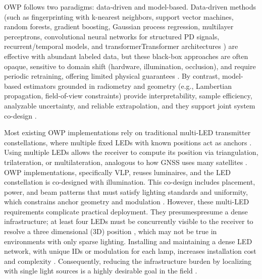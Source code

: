 \documentclass[journal]{IEEEtran}
\newcommand{\added}[1]{{\color{blue}#1}}
\newcommand{\deleted}[1]{{\color{red}#1}}
\begin{document}
OWP follows two paradigms: data-driven and model-based.
Data-driven methods (such as fingerprinting with k-nearest neighbors, support vector machines, random forests, gradient boosting, Gaussian process regression, multilayer perceptrons, convolutional neural networks for structured PD signals, recurrent/temporal models, and \deleted{transformer}\added{Transformer} architectures \cite{Rekkas2023, Tran2022}) are effective with abundant labeled data, but these black-box approaches are often opaque, sensitive to domain shift (hardware, illumination, occlusion), and require periodic retraining, offering limited physical guarantees \cite{Glass2021}. 
By contrast, model-based estimators grounded in radiometry and geometry (e.g., Lambertian propagation, field-of-view constraints) provide interpretability, sample efficiency, analyzable uncertainty, and reliable extrapolation, and they support joint system co-design \cite{Deng2023}.



Most existing OWP implementations rely on traditional multi-LED transmitter constellations, where multiple fixed LEDs with known positions act as anchors \cite{Zhuang2018}. Using multiple LEDs allows the receiver to compute its position via triangulation, trilateration, or multilateration, analogous to how GNSS uses many satellites \cite{Wang2024b}. 
OWP implementations, specifically VLP, reuses luminaires, and the LED constellation is co-designed with illumination. This co-design includes placement, power, and beam patterns that must satisfy lighting standards and uniformity, which constrains anchor geometry and modulation \cite{photonics9100750}.
However, these multi-LED requirements complicate practical deployment. They \deleted{presumes}\added{presume} a dense infrastructure; at least four LEDs must be concurrently visible to the receiver to resolve a three dimensional (3D) position \cite{Plets2019,electronics8111311, ALMADANI2021126654,Zhang2020}, which may not be true in environments with only sparse lighting. Installing and maintaining a dense LED network, with unique IDs or modulation for each lamp, increases installation cost and complexity \cite{Cossu2022}. 
Consequently, reducing the infrastructure burden by localizing with single light sources is a highly desirable goal in the field \cite{Rekkas2023}.
\end{document}
